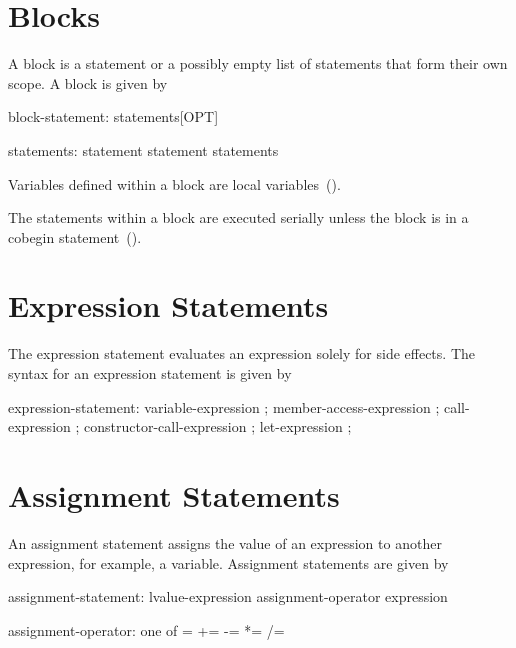 \section{Blocks}
\label{Blocks}

A block is a statement or a possibly empty list of statements that
form their own scope.  A block is given by
\begin{syntax}
block-statement:
  { statements[OPT] }

statements:
  statement
  statement statements
\end{syntax}

Variables defined within a block are local
variables~().

The statements within a block are executed serially unless the block
is in a cobegin statement~().

\section{Expression Statements}
\label{Expression_Statements}
The expression statement evaluates an expression solely for side
effects. The syntax for an expression statement is given by
\begin{syntax}
expression-statement:
  variable-expression ;
  member-access-expression ;
  call-expression ;
  constructor-call-expression ;
  let-expression ; 
\end{syntax}

\section{Assignment Statements}
\label{Assignment_Statements}

An assignment statement assigns the value of an expression to another
expression, for
example, a variable.  Assignment statements are given by

\begin{syntax}
assignment-statement:
  lvalue-expression assignment-operator expression

assignment-operator: one of
   = += -= *= /= %
\end{syntax}

